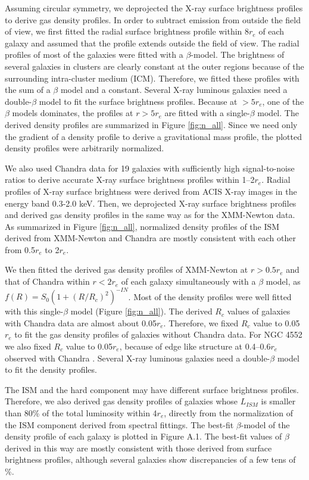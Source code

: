 \documentclass[structabstract]{aa}
\begin{document}
Assuming circular symmetry, we deprojected the X-ray surface
brightness profiles to derive gas density profiles. In order to
subtract emission from outside the field of view, we
first fitted the radial surface brightness profile within 8$r_e$ of each
galaxy and assumed that the profile extends outside the field of
view. The radial profiles of most of the galaxies were fitted with a
$\beta$-model. The brightness of several galaxies in clusters are clearly
constant at the outer regions because of the surrounding intra-cluster
medium (ICM). Therefore, we fitted these profiles with the sum of a $\beta$
model and a constant. Several X-ray luminous galaxies need a double-$\beta$
model to fit the surface brightness profiles. Because at $>5r_e$, one
of the $\beta$ models dominates, the profiles at $r>5r_e$ are fitted with a
single-$\beta$ model. The derived density profiles are summarized in Figure
\ref{fig:n_all}. Since we need only the gradient of a density profile to derive a
gravitational mass profile, the plotted density profiles were
arbitrarily normalized.


We also used Chandra data for 19 galaxies with sufficiently high
signal-to-noise ratios to derive accurate X-ray surface brightness
profiles  within 1--2$r_e$. Radial profiles of X-ray surface
brightness were derived from ACIS X-ray images in the energy band
0.3-2.0 keV. Then, we deprojected X-ray surface brightness
profiles and derived gas density profiles in the same way as for the
XMM-Newton data. As summarized in Figure \ref{fig:n_all}, normalized density
profiles of the ISM derived from XMM-Newton and Chandra are mostly
consistent with each other from 0.5$r_e$ to  2$r_e$. 

We then fitted the derived gas density profiles of XMM-Newton at
$r>0.5r_e$ and that of Chandra within $r<2r_e$ of each galaxy
simultaneously with a $\beta$ model, as $f(R)=S_0(1+(R/R_c)^{2})^{-IN}$.
Most of the density profiles were well
fitted with this single-$\beta$ model (Figure \ref{fig:n_all}).
The derived $R_c$ values of galaxies with Chandra data
are almost about 0.05$r_e$.
Therefore, we fixed $R_c$ value  to 0.05$r_e$ to fit the  gas density
profiles  of galaxies without Chandra data.
For NGC 4552 we also fixed $R_c$ value to 0.05$r_e$, because of
edge like structure at 0.4--0.6$r_e$ 
observed with Chandra \citep{Mach2006}.
 Several
X-ray luminous galaxies need a double-$\beta$ model to fit the density
profiles.


The ISM and the hard component may have different
surface brightness profiles. Therefore,
we also derived gas density profiles of galaxies whose $L_{ISM}$ is
smaller than 80\% of the total luminosity within 4$r_e$,
directly from the normalization of the ISM component derived from
spectral fittings. The best-fit $\beta$-model of the density profile of
each galaxy is plotted in Figure A.1. 
The best-fit values of $\beta$ derived  in this way
are mostly consistent with those derived from surface brightness profiles,
although several galaxies show discrepancies of a few tens of \%.
\end{document}
